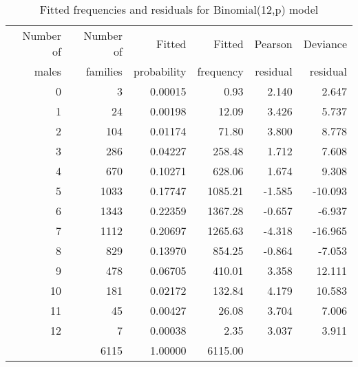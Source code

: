 \begin{table}[htb]
\caption{Fitted frequencies and residuals for Binomial(12,p) model}
\label{tab:saxfit}
 \begin{center}
  \begin{tabular}{rrrrrr}
  \hline
Number of & Number of & Fitted  & Fitted  & Pearson  & Deviance  \\
 males &  families &  probability &  frequency & residual &  residual \\
  \hline
0 & 3 & 0.00015 & 0.93 & 2.140 & 2.647 \\
1 & 24 & 0.00198 & 12.09 & 3.426 & 5.737 \\
2 & 104 & 0.01174 & 71.80 & 3.800 & 8.778 \\
3 & 286 & 0.04227 & 258.48 & 1.712 & 7.608 \\
4 & 670 & 0.10271 & 628.06 & 1.674 & 9.308 \\
5 & 1033 & 0.17747 & 1085.21 & -1.585 & -10.093 \\
6 & 1343 & 0.22359 & 1367.28 & -0.657 & -6.937 \\
7 & 1112 & 0.20697 & 1265.63 & -4.318 & -16.965 \\
8 & 829 & 0.13970 & 854.25 & -0.864 & -7.053 \\
9 & 478 & 0.06705 & 410.01 & 3.358 & 12.111 \\
10 & 181 & 0.02172 & 132.84 & 4.179 & 10.583 \\
11 & 45 & 0.00427 & 26.08 & 3.704 & 7.006 \\
12 & 7 & 0.00038 & 2.35 & 3.037 & 3.911 \\
   \cline{2-4}
   &6115 &  1.00000 & 6115.00    \\                    
  \hline
  \end{tabular}
 \end{center}
\end{table}
